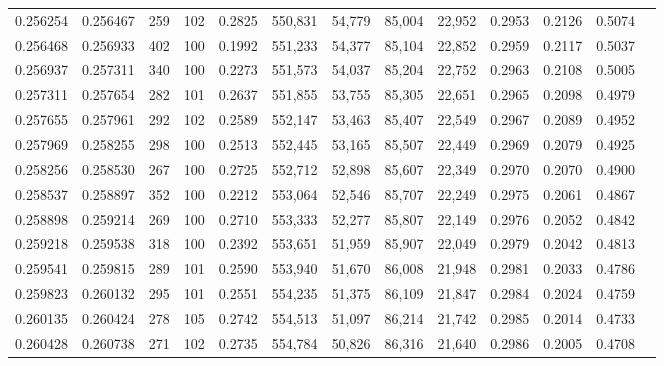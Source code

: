 \begin{tabular}{rrrrrrrrrrrrr}
0.256254 & 0.256467 &   259 & 102 &                                     0.2825 & 550,831 &  54,779 &  85,004 &  22,952 & 0.2953 & 0.2126 & 0.5074 \\
0.256468 & 0.256933 &   402 & 100 &                                     0.1992 & 551,233 &  54,377 &  85,104 &  22,852 & 0.2959 & 0.2117 & 0.5037 \\
0.256937 & 0.257311 &   340 & 100 &                                     0.2273 & 551,573 &  54,037 &  85,204 &  22,752 & 0.2963 & 0.2108 & 0.5005 \\
0.257311 & 0.257654 &   282 & 101 &                                     0.2637 & 551,855 &  53,755 &  85,305 &  22,651 & 0.2965 & 0.2098 & 0.4979 \\
0.257655 & 0.257961 &   292 & 102 &                                     0.2589 & 552,147 &  53,463 &  85,407 &  22,549 & 0.2967 & 0.2089 & 0.4952 \\
0.257969 & 0.258255 &   298 & 100 &                                     0.2513 & 552,445 &  53,165 &  85,507 &  22,449 & 0.2969 & 0.2079 & 0.4925 \\
0.258256 & 0.258530 &   267 & 100 &                                     0.2725 & 552,712 &  52,898 &  85,607 &  22,349 & 0.2970 & 0.2070 & 0.4900 \\
0.258537 & 0.258897 &   352 & 100 &                                     0.2212 & 553,064 &  52,546 &  85,707 &  22,249 & 0.2975 & 0.2061 & 0.4867 \\
0.258898 & 0.259214 &   269 & 100 &                                     0.2710 & 553,333 &  52,277 &  85,807 &  22,149 & 0.2976 & 0.2052 & 0.4842 \\
0.259218 & 0.259538 &   318 & 100 &                                     0.2392 & 553,651 &  51,959 &  85,907 &  22,049 & 0.2979 & 0.2042 & 0.4813 \\
0.259541 & 0.259815 &   289 & 101 &                                     0.2590 & 553,940 &  51,670 &  86,008 &  21,948 & 0.2981 & 0.2033 & 0.4786 \\
0.259823 & 0.260132 &   295 & 101 &                                     0.2551 & 554,235 &  51,375 &  86,109 &  21,847 & 0.2984 & 0.2024 & 0.4759 \\
0.260135 & 0.260424 &   278 & 105 &                                     0.2742 & 554,513 &  51,097 &  86,214 &  21,742 & 0.2985 & 0.2014 & 0.4733 \\
0.260428 & 0.260738 &   271 & 102 &                                     0.2735 & 554,784 &  50,826 &  86,316 &  21,640 & 0.2986 & 0.2005 & 0.4708 \\

\end{tabular}
